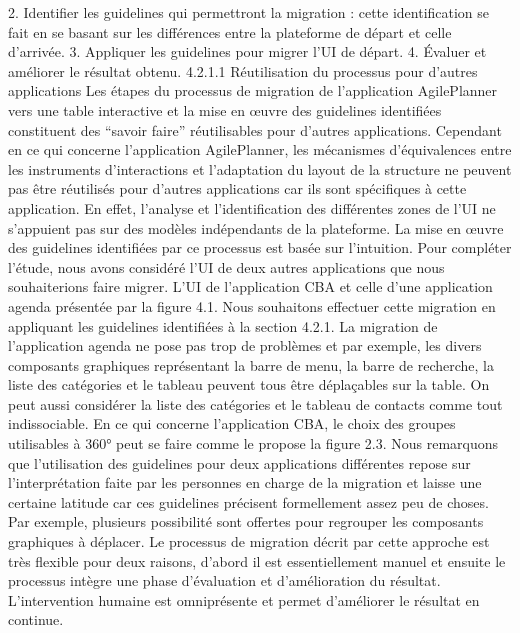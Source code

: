 \documentclass{article}
\begin{document}
2. Identiﬁer les guidelines qui permettront la migration : cette identiﬁcation se fait en se basant sur
les diff\'{e}rences entre la plateforme de d\'{e}part et celle d’arriv\'{e}e.
3. Appliquer les guidelines pour migrer l’UI de d\'{e}part.
4. Évaluer et am\'{e}liorer le r\'{e}sultat obtenu.
4.2.1.1
R\'{e}utilisation du processus pour d’autres applications
Les \'{e}tapes du processus de migration de l’application AgilePlanner vers une table interactive et
la mise en œuvre des guidelines identiﬁ\'{e}es constituent des “savoir faire” r\'{e}utilisables pour d’autres
applications.
Cependant en ce qui concerne l’application AgilePlanner, les m\'{e}canismes d’\'{e}quivalences entre les
instruments d’interactions et l’adaptation du layout de la structure ne peuvent pas \^{e}tre r\'{e}utilis\'{e}s pour
d’autres applications car ils sont sp\'{e}ciﬁques \`{a} cette application. En effet, l’analyse et l’identiﬁcation
des diff\'{e}rentes zones de l’UI ne s’appuient pas sur des mod\`{e}les ind\'{e}pendants de la plateforme.
La mise en œuvre des guidelines identiﬁ\'{e}es par ce processus est bas\'{e}e sur l’intuition. Pour compl\'{e}ter l’\'{e}tude, nous avons consid\'{e}r\'{e} l’UI de deux autres applications que nous souhaiterions faire
migrer. L’UI de l’application CBA et celle d’une application agenda pr\'{e}sent\'{e}e par la ﬁgure 4.1. Nous
souhaitons effectuer cette migration en appliquant les guidelines identiﬁ\'{e}es \`{a} la section 4.2.1. La migration de l’application agenda ne pose pas trop de probl\`{e}mes et par exemple, les divers composants
graphiques repr\'{e}sentant la barre de menu, la barre de recherche, la liste des cat\'{e}gories et le tableau
peuvent tous \^{e}tre d\'{e}pla\c{c}ables sur la table. On peut aussi consid\'{e}rer la liste des cat\'{e}gories et le tableau
de contacts comme tout indissociable. En ce qui concerne l’application CBA, le choix des groupes
utilisables \`{a} 360° peut se faire comme le propose la ﬁgure 2.3. Nous remarquons que l’utilisation
des guidelines pour deux applications diff\'{e}rentes repose sur l’interpr\'{e}tation faite par les personnes
en charge de la migration et laisse une certaine latitude car ces guidelines pr\'{e}cisent formellement
assez peu de choses. Par exemple, plusieurs possibilit\'{e} sont offertes pour regrouper les composants
graphiques \`{a} d\'{e}placer.
Le processus de migration d\'{e}crit par cette approche est tr\`{e}s ﬂexible pour deux raisons, d’abord il
est essentiellement manuel et ensuite le processus int\`{e}gre une phase d’\'{e}valuation et d’am\'{e}lioration du
r\'{e}sultat. L’intervention humaine est omnipr\'{e}sente et permet d’am\'{e}liorer le r\'{e}sultat en continue.
\end{document}
